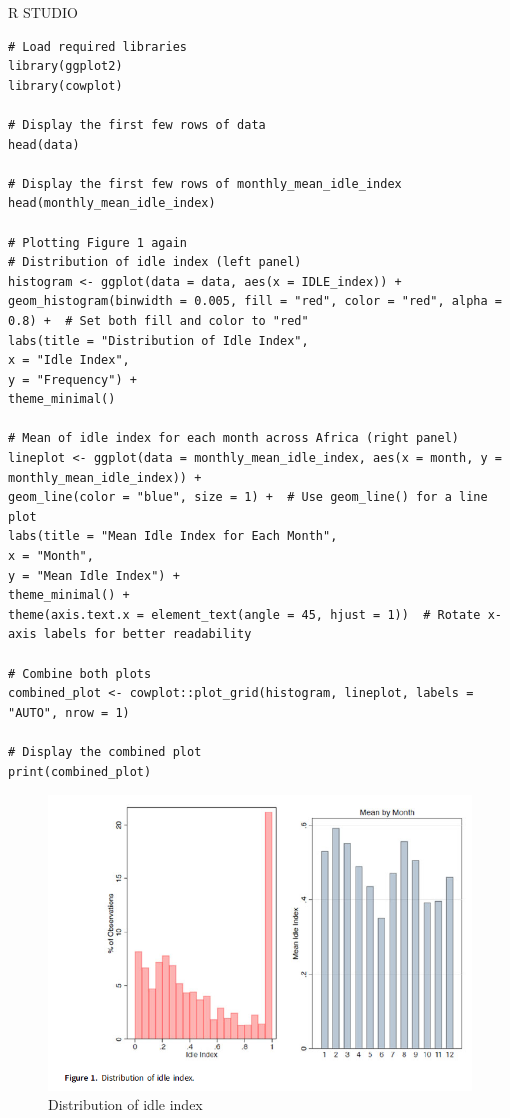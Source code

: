 \documentclass[12pt,letterpaper]{article}
\begin{document}
R STUDIO
\begin{lstlisting}
# Load required libraries
library(ggplot2)
library(cowplot)

# Display the first few rows of data
head(data)

# Display the first few rows of monthly_mean_idle_index
head(monthly_mean_idle_index)

# Plotting Figure 1 again
# Distribution of idle index (left panel)
histogram <- ggplot(data = data, aes(x = IDLE_index)) +
geom_histogram(binwidth = 0.005, fill = "red", color = "red", alpha = 0.8) +  # Set both fill and color to "red"
labs(title = "Distribution of Idle Index",
x = "Idle Index",
y = "Frequency") +
theme_minimal()

# Mean of idle index for each month across Africa (right panel)
lineplot <- ggplot(data = monthly_mean_idle_index, aes(x = month, y = monthly_mean_idle_index)) +
geom_line(color = "blue", size = 1) +  # Use geom_line() for a line plot
labs(title = "Mean Idle Index for Each Month",
x = "Month",
y = "Mean Idle Index") +
theme_minimal() +
theme(axis.text.x = element_text(angle = 45, hjust = 1))  # Rotate x-axis labels for better readability

# Combine both plots
combined_plot <- cowplot::plot_grid(histogram, lineplot, labels = "AUTO", nrow = 1)

# Display the combined plot
print(combined_plot)		
\end{lstlisting}

\begin{figure}[htbp]
	\centering
	\includegraphics[width=1.0\textwidth]{Figure 1 Distribution of idle index.png}
	\caption{Distribution of idle index}
	\label{fig:agri_conflict}
\end{figure}
\end{document}
